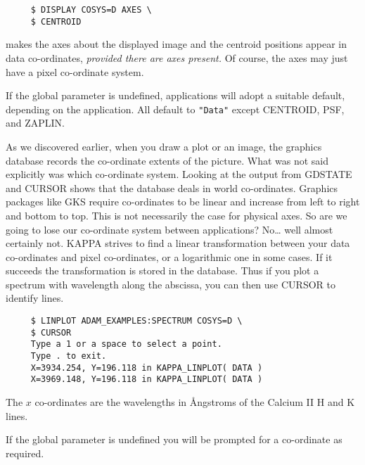 {\small
\begin{verbatim}
     $ DISPLAY COSYS=D AXES \
     $ CENTROID
\end{verbatim}
\normalsize
makes the axes about the displayed image and the centroid positions
appear in data co-ordinates, {\em provided there are axes present.}
Of course, the axes may just have a pixel co-ordinate system.

If the global parameter is undefined, applications will adopt 
a suitable default, depending on the application.  All default to
{\tt "Data"} except CENTROID, PSF, and ZAPLIN.

As we discovered earlier, when you draw a plot or an image, the
graphics database records the co-ordinate extents of the picture.
What was not said explicitly was which co-ordinate system.  Looking
at the output from GDSTATE and CURSOR shows that the database
deals in world co-ordinates.
Graphics packages like GKS require co-ordinates to be linear
and increase from left to right and bottom to top.  This is
not necessarily the case for physical axes.  So are we going
to lose our co-ordinate system between applications?  No\ldots
well almost certainly not.
{\small KAPPA} strives to find a linear transformation between
your data co-ordinates and pixel co-ordinates, or a logarithmic
one in some cases.  If it succeeds the transformation is stored
in the database.  Thus if you plot a spectrum with wavelength
along the abscissa, you can then use CURSOR to identify lines.

\small
\begin{verbatim}
     $ LINPLOT ADAM_EXAMPLES:SPECTRUM COSYS=D \
     $ CURSOR
     Type a 1 or a space to select a point.
     Type . to exit.
     X=3934.254, Y=196.118 in KAPPA_LINPLOT( DATA )
     X=3969.148, Y=196.118 in KAPPA_LINPLOT( DATA )
\end{verbatim}
\normalsize
The $x$ co-ordinates are the wavelengths in {\AA}ngstroms of the Calcium
II H and K lines.

If the global parameter is undefined you will be prompted for
a co-ordinate as required.

}
